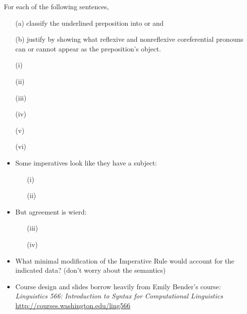\documentclass[a4paper,landscape,headrule,footrule]{foils}
\begin{document}
For each of the following sentences, 
\begin{itemize}
\item[(a)] classify the underlined preposition into 
  or  and
\item[(b)] justify by showing what reflexive and
  nonreflexive coreferential 
  pronouns can or cannot appear as the preposition's object.
\end{itemize}
\begin{itemize}\addtolength{\itemsep}{-1.5ex}
\item[(i)] 
\item[(ii)] 
\item[(iii)] 
\item[(iv)] 
\item[(v)] 
\item[(vi)] 
\end{itemize}

\begin{itemize}
\item Some imperatives look like they have a subject:
  \begin{itemize}
  \item[(i)] 
  \item[(ii)] 
  \end{itemize}
\item But agreement is wierd:
  \begin{itemize}
  \item[(iii)] 
  \item[(iv)]
  \end{itemize}
\item What minimal modification of the Imperative Rule would account for
the indicated data? (don't worry about
the semantics)
\end{itemize}




\begin{itemize}
\item Course design and slides borrow heavily from Emily Bender's course:
\textit{Linguistics 566: Introduction to Syntax for Computational Linguistics}
\\ \url{http://courses.washington.edu/ling566}
\end{itemize}


%
\end{document}
